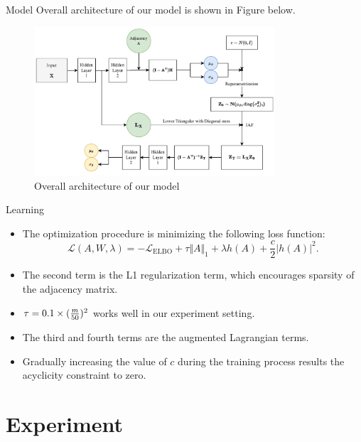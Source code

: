\documentclass{beamer}
\begin{document}
\begin{frame}{Model}
    Overall architecture of our model is shown in Figure below.
    \begin{figure}
        \centering
        \includegraphics[width=0.8\textwidth]{fig/model.pdf}
        \caption{Overall architecture of our model}
        \label{fig:architecture}
    \end{figure}
\end{frame}

\begin{frame}{Learning}
    \begin{itemize}
        \item The optimization procedure is minimizing the following loss function:
        \begin{equation}
            \mathcal{L}(A, W, \lambda) =-\mathcal{L}_{\mathrm{ELBO}} + \tau \Vert A \Vert_1 + \lambda h(A) + \frac{c}{2} |h(A)|^2.
        \end{equation}
        \item The second term is the L1 regularization term, which encourages sparsity of the adjacency matrix.
        \item $\tau=0.1 \times ({m\over 50})^2$ works well in our experiment setting.
        \item The third and fourth terms are the augmented Lagrangian terms.
        \item Gradually increasing the value of $c$ during the training process results the acyclicity constraint to zero.
    \end{itemize}
\end{frame}
            

\section{Experiment}
\end{document}

